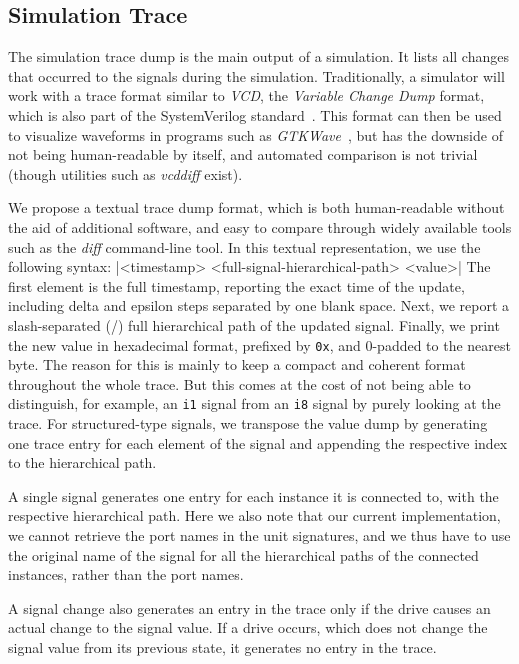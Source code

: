 
\subsection{Simulation Trace}
\label{sec:trace}
The simulation trace dump is the main output of a simulation. It lists all changes that occurred to the signals during the simulation. Traditionally, a simulator will work with a trace format similar to \textit{VCD}, the \textit{Variable Change Dump} format, which is also part of the SystemVerilog standard~\cite{SV2018}. This format can then be used to visualize waveforms in programs such as \textit{GTKWave}~\cite{gtkwave}, but has the downside of not being human-readable by itself, and automated comparison is not trivial (though utilities such as \textit{vcddiff} \cite{vcddiff} exist).

We propose a textual trace dump format, which is both human-readable without the aid of additional software, and easy to compare through widely available tools such as the \textit{diff} command-line tool.
In this textual representation, we use the following syntax:
|<timestamp>  <full-signal-hierarchical-path>  <value>|
\noindent The first element is the full timestamp, reporting the exact time of the update, including delta and epsilon steps separated by one blank space. Next, we report a slash-separated (/) full hierarchical path of the updated signal. Finally, we print the new value in hexadecimal format, prefixed by \texttt{0x}, and $0$-padded to the nearest byte. The reason for this is mainly to keep a compact and coherent format throughout the whole trace. But this comes at the cost of not being able to distinguish, for example, an \texttt{i1} signal from an \texttt{i8} signal by purely looking at the trace.
For structured-type signals, we transpose the value dump by generating one trace entry for each element of the signal and appending the respective index to the hierarchical path.

A single signal generates one entry for each instance it is connected to, with the respective hierarchical path. Here we also note that our current implementation, we cannot retrieve the port names in the unit signatures, and we thus have to use the original name of the signal for all the hierarchical paths of the connected instances, rather than the port names.

A signal change also generates an entry in the trace only if the drive causes an actual change to the signal value. If a drive occurs, which does not change the signal value from its previous state, it generates no entry in the trace.

